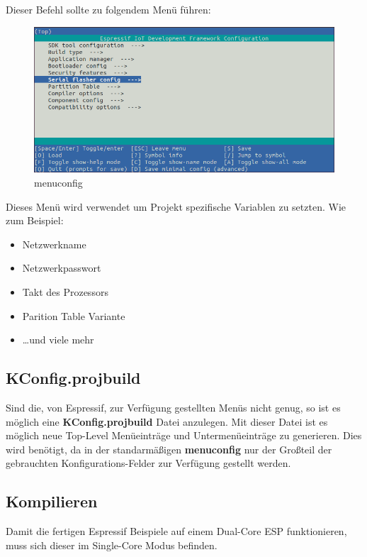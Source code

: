 Dieser Befehl sollte zu folgendem Menü führen:
\begin{figure}[H]
    \begin{center}
        \includegraphics[scale=0.5]{images/menuconfig.png}
        \caption{menuconfig \cite{menuconfig_picture}}
    \end{center}
\end{figure}
\pagebreak
Dieses Menü wird verwendet um Projekt spezifische Variablen zu setzten. Wie zum Beispiel:
\begin{itemize}
    \item Netzwerkname
    \item Netzwerkpasswort
    \item Takt des Prozessors
    \item Parition Table Variante
    \item \dots und viele mehr
\end{itemize}

\subsection{KConfig.projbuild}\label{sec:esp-idf-projbuild}
Sind die, von Espressif, zur Verfügung gestellten Menüs nicht genug, so ist es möglich eine \textbf{KConfig.projbuild} Datei anzulegen. Mit dieser Datei ist es möglich neue Top-Level Menüeinträge und Untermenüeinträge zu generieren. Dies wird benötigt, da in der standarmäßigen \textbf{menuconfig} nur der Großteil der gebrauchten Konfigurations-Felder zur Verfügung gestellt werden.

\subsection{Kompilieren}
Damit die fertigen Espressif Beispiele auf einem Dual-Core ESP funktionieren, muss sich dieser im Single-Core Modus befinden.


